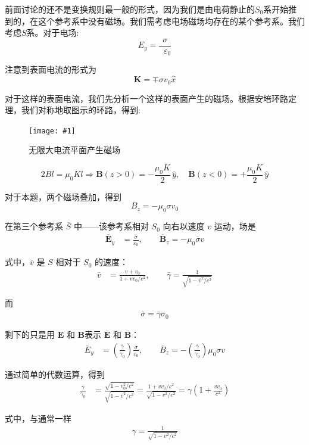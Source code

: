 \documentclass[12pt,a4paper,oneside]{report}
\theoremstyle{definition}
\theoremstyle{remark}
\newcommand{\insertfig}[3]{
    \begin{figure}[ht]
        \centering
        \texttt{[image: \#1]}
        \caption{#2}
        \label{fig:#1}
    \end{figure}
}
\renewcommand{\v}{\mathop{}\!\varepsilon}
\begin{document}
前面讨论的还不是变换规则最一般的形式，因为我们是由电荷静止的$S_0$系开始推到的，在这个参考系中没有磁场。我们需考虑电场磁场均存在的某个参考系。我们考虑$S$系。对于电场:
\[
E_y = \frac{\sigma}{\v_0}
\]

注意到表面电流的形式为
\[
\mathbf K = \mp \sigma v_0 \hat x 
\]

对于这样的表面电流，我们先分析一个这样的表面产生的磁场。根据安培环路定理，我们对称地取图示的环路，得到:

\insertfig{5-9.png}{无限大电流平面产生磁场}{0.5}
\[
2Bl = \mu_0Kl \Rightarrow\mathbf B(z>0)=-\dfrac{\mu_0 K}{2}\,\hat y,\quad \mathbf B(z<0)=+\dfrac{\mu_0 K}{2}\,\hat y
\]

对于本题，两个磁场叠加，得到
\[
B_z = -\mu_0 \sigma v_0 
\]

在第三个参考系 $\overline{S}$ 中——该参考系相对 $S_0$ 向右以速度 $v$ 运动，场是
\begin{align*}
\overline{\mathbf E}_y &= \frac{\overline{\sigma}}{\varepsilon_0}, \qquad 
\overline{\mathbf B}_z = -\mu_0 \overline{\sigma} v 
\end{align*}

式中，$\overline v$ 是 $S$ 相对于 $S_0$ 的速度：
\begin{align*}
\overline v &= \frac{v + v_0}{1 + v v_0 / c^2}, 
\qquad 
\overline{\gamma} = \frac{1}{\sqrt{1 - \overline v^2 / c^2}} 
\end{align*}

而
\begin{align*}
\overline \sigma = \overline \gamma \sigma_0 
\end{align*}

剩下的只是用 $\mathbf E$ 和 $\mathbf B$表示
$\overline{\mathbf E}$ 和 $\overline{\mathbf B}$：
\begin{align*}
\overline E_y &= \left(\frac{\overline{\gamma}}{\gamma_0}\right)\frac{\sigma}{\varepsilon_0}, 
\qquad 
\overline B_z = -\left(\frac{\overline{\gamma}}{\gamma_0}\right)\mu_0 \sigma v 
\end{align*}

通过简单的代数运算，得到
\begin{align*}
\frac{\overline{\gamma}}{\gamma_0} 
&= \frac{\sqrt{1 - v_0^2 / c^2}}{\sqrt{1 - \overline v^2 / c^2}}
   = \frac{1 + v v_0 / c^2}{\sqrt{1 - v^2 / c^2}} 
   = \gamma \left( 1 + \frac{v v_0}{c^2} \right) 
\end{align*}

式中，与通常一样
\begin{align*}
\gamma = \frac{1}{\sqrt{1 - v^2 / c^2}} 
\end{align*}
\end{document}
